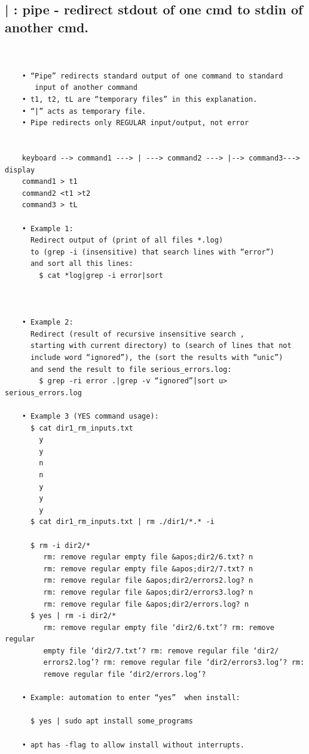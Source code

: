 \documentclass[a4paper,12pt]{article}
\begin{document}
\subsection{ |     : pipe - redirect stdout of one cmd to stdin of another cmd.}
\begin{verbatim}


    • “Pipe” redirects standard output of one command to standard 
       input of another command
    • t1, t2, tL are “temporary files” in this explanation.
    • “|” acts as temporary file.
    • Pipe redirects only REGULAR input/output, not error


    keyboard --> command1 ---> | ---> command2 ---> |--> command3---> display
    command1 > t1
    command2 <t1 >t2
    command3 > tL
    
    • Example 1: 
      Redirect output of (print of all files *.log)
      to (grep -i (insensitive) that search lines with “error”)
      and sort all this lines:   
        $ cat *log|grep -i error|sort  
        


    • Example 2:
      Redirect (result of recursive insensitive search ,
      starting with current directory) to (search of lines that not    
      include word “ignored”), the (sort the results with “unic”)
      and send the result to file serious_errors.log:  
        $ grep -ri error .|grep -v “ignored”|sort u> serious_errors.log
        
    • Example 3 (YES command usage):          
      $ cat dir1_rm_inputs.txt
        y
        y
        n
        n
        y
        y
        y
      $ cat dir1_rm_inputs.txt | rm ./dir1/*.* -i

      $ rm -i dir2/*
         rm: remove regular empty file &apos;dir2/6.txt? n
         rm: remove regular empty file &apos;dir2/7.txt? n
         rm: remove regular file &apos;dir2/errors2.log? n
         rm: remove regular file &apos;dir2/errors3.log? n
         rm: remove regular file &apos;dir2/errors.log? n
      $ yes | rm -i dir2/*
         rm: remove regular empty file ‘dir2/6.txt’? rm: remove regular                             
         empty file ‘dir2/7.txt’? rm: remove regular file ‘dir2/
         errors2.log’? rm: remove regular file ‘dir2/errors3.log’? rm: 
         remove regular file ‘dir2/errors.log’?
         
    • Example: automation to enter “yes”  when install: 

      $ yes | sudo apt install some_programs

    • apt has -flag to allow install without interrupts.          
         
         
\end{verbatim}
\end{document}
